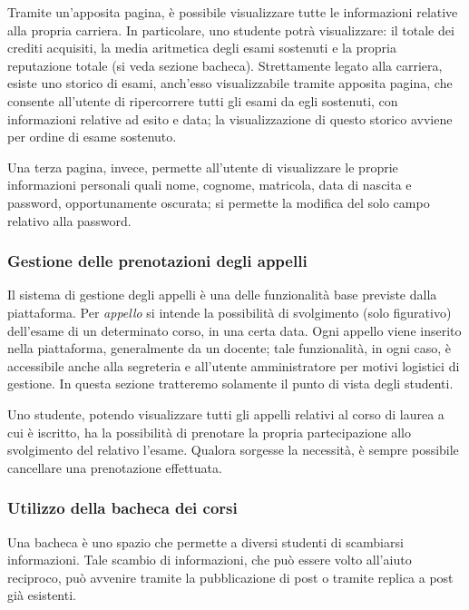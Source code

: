 \documentclass [a4paper,11pt]{book}
\begin{document}
Tramite un'apposita pagina, è possibile visualizzare tutte le informazioni relative alla propria carriera. In particolare, uno studente potrà visualizzare: il totale dei crediti acquisiti, la media aritmetica degli esami sostenuti e la propria reputazione totale (si veda sezione bacheca). Strettamente legato alla carriera, esiste uno storico di esami, anch'esso visualizzabile tramite apposita pagina, che consente all'utente di ripercorrere tutti gli esami da egli sostenuti, con informazioni relative ad esito e data; la visualizzazione di questo storico avviene per ordine di esame sostenuto.

Una terza pagina, invece, permette all'utente di visualizzare le proprie informazioni personali quali nome, cognome, matricola, data di nascita e password, opportunamente oscurata; si permette la modifica del solo campo relativo alla password.

\medskip

\subsubsection{Gestione delle prenotazioni degli appelli}

Il sistema di gestione degli appelli è una delle funzionalità base previste dalla piattaforma. Per \emph{appello} si intende la possibilità di svolgimento (solo figurativo) dell'esame di un determinato corso, in una certa data. Ogni appello viene inserito nella piattaforma, generalmente da un docente; tale funzionalità, in ogni caso, è accessibile anche alla segreteria e all'utente amministratore per motivi logistici di gestione. In questa sezione tratteremo solamente il punto di vista degli studenti.

Uno studente, potendo visualizzare tutti gli appelli relativi al corso di laurea a cui è iscritto, ha la possibilità di prenotare la propria partecipazione allo svolgimento del relativo l'esame. Qualora sorgesse la necessità, è sempre possibile cancellare una prenotazione effettuata.

\medskip

\subsubsection{Utilizzo della bacheca dei corsi}

\label{sec:bacheca}

Una bacheca è uno spazio che permette a diversi studenti di scambiarsi informazioni. Tale scambio di informazioni, che può essere volto all'aiuto reciproco, può avvenire tramite la pubblicazione di post o tramite replica a post già esistenti.
\end{document}

